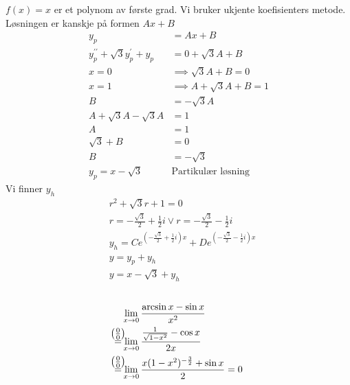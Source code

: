 \documentclass[defaultpackages]{cheatsheet}
\newcommand*{\myeq}[1]{\stackrel{\mathclap{\normalfont\mbox{$\left(#1\right)$}}}{=}}
\begin{document}
	\subsubsection{}
	$f(x) = x$ er et polynom av første grad. Vi bruker ukjente koefisienters metode. Løsningen er kanskje på formen $Ax+B$
	\begin{align*}
		y_p &= Ax + B\\
		y^{\prime\prime}_p + \sqrt{3}y_p^\prime + y_p &= 0 + \sqrt{3}A + B\\
		x=0&\implies\sqrt{3}A + B = 0\\
		x=1&\implies A+\sqrt{3}A+B=1\\
		B&=-\sqrt{3}A\\
		A + \sqrt{3}A - \sqrt{3}A &= 1\\
		A &= 1\\
		\sqrt{3} + B &= 0\\
		B &= -\sqrt{3}\\
		y_p = x - \sqrt{3} \quad&\text{Partikulær løsning}
	\end{align*}
	Vi finner $y_h$
	\begin{align*}
		&r^2 + \sqrt{3}r + 1 = 0\\
		&r = -\frac{\sqrt{3}}{2} + \frac{1}{2}i \vee r = -\frac{\sqrt{3}}{2} - \frac{1}{2}i\\
		&y_h = Ce^{\left(-\frac{\sqrt{3}}{2} + \frac{1}{2}i\right)x}+  De^{\left(-\frac{\sqrt{3}}{2} - \frac{1}{2}i\right)x}\\
		&y = y_p + y_h\\
		&y = x - \sqrt{3} + y_h
	\end{align*}
	\subsection{}
	\subsubsection{}
	\begin{align*}
		&\lim_{x\to 0} \frac{\arcsin x - \sin x}{x^2}\\
		\myeq{\frac{0}{0}}&\lim_{x\to 0} \frac{\frac{1}{\sqrt{1-x^2}} - \cos x}{2x}\\
		\myeq{\frac{0}{0}}&\lim_{x\to 0} \frac{x(1-x^2)^{-\frac{3}{2}}+\sin x}{2} = 0
	\end{align*}
\end{document}
